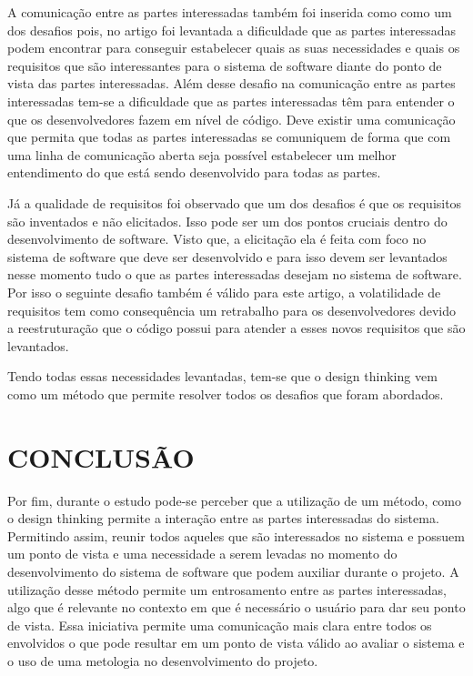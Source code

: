 \documentclass[a4paper,twoside]{article}
\begin{document}
A comunicação entre as partes interessadas também foi inserida como
como um dos desafios pois, no artigo \cite{DBLP:conf/sac/PereiraPPMC21} foi levantada a dificuldade que as partes interessadas podem encontrar para conseguir estabelecer quais as suas necessidades e quais os requisitos que são interessantes para o sistema de software diante do ponto de vista das partes interessadas.
Além desse desafio na comunicação entre as partes interessadas tem-se a dificuldade que as partes interessadas têm para entender o que os desenvolvedores fazem em nível de código. Deve existir uma comunicação que permita que todas as partes interessadas se comuniquem de forma que com uma linha de comunicação aberta seja possível estabelecer um melhor entendimento do que está sendo desenvolvido para todas as partes\cite{DBLP:conf/sac/PereiraPPMC21}.

Já a qualidade de requisitos foi observado que um dos desafios é que os requisitos são inventados e não elicitados. Isso pode ser um dos pontos cruciais dentro do desenvolvimento de software. Visto que, a elicitação ela é feita com foco no sistema de software que deve ser desenvolvido e para isso devem ser levantados nesse momento tudo o que as partes interessadas desejam no sistema de software. Por isso o seguinte desafio também é válido para este artigo, a volatilidade de requisitos tem como consequência um retrabalho para os desenvolvedores devido a reestruturação que o código possui para atender a esses novos requisitos que são levantados\cite{DBLP:conf/sac/PereiraPPMC21}.

Tendo todas essas necessidades levantadas, tem-se que o design thinking vem como um método que permite resolver todos os desafios que foram abordados.

\section{\uppercase{Conclusão}}

Por fim, durante o estudo pode-se perceber que a utilização de um método, como o design thinking permite a interação entre as partes interessadas do sistema. Permitindo assim, reunir todos aqueles que são interessados no sistema e possuem um ponto de vista e uma necessidade a serem levadas no momento do desenvolvimento do sistema de software que podem auxiliar durante o projeto.  A utilização desse método permite um entrosamento entre as partes interessadas, algo que é relevante no contexto em que é necessário o usuário para dar seu ponto de vista. Essa iniciativa permite uma comunicação mais clara entre todos os envolvidos o que pode resultar em um ponto de vista válido ao avaliar o sistema e o uso de uma metologia no desenvolvimento do projeto.


{\small 
}
\end{document}
